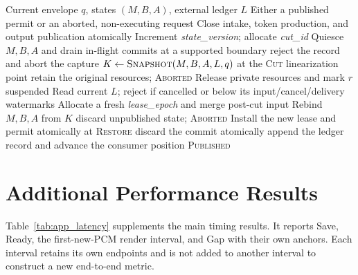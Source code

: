 \begin{algorithm}[tbp]
\caption{Save/resume protocol for logical request $r$.}
\label{alg:save_resume}
\begin{algorithmic}[1]
\Require Current envelope $q$, states $(M,B,A)$, external ledger $L$
\Ensure Either a published permit or an aborted, non-executing request
\State Close intake, token production, and output publication atomically
\State Increment \textit{state\_version}; allocate \textit{cut\_id}
\State Quiesce $M,B,A$ and drain in-flight commits at a supported boundary
    \State reject the record and abort the capture
\EndIf
\State $K \gets \Call{Snapshot}{M,B,A,L,q}$ at the \textsc{Cut} linearization point
    \State retain the original resources; \Return \textsc{Aborted}
\EndIf
\State Release private resources and mark $r$ suspended
\State Read current $L$; reject if cancelled or below its input/cancel/delivery watermarks
\State Allocate a fresh \textit{lease\_epoch} and merge post-cut input
\State Rebind $M,B,A$ from $K$
    \State discard unpublished state; \Return \textsc{Aborted}
\EndIf
\State Install the new lease and permit atomically at \textsc{Restore}
        \State discard the commit
    \Else
        \State atomically append the ledger record and advance the consumer position
    \EndIf
\EndWhile
\State \Return \textsc{Published}
\end{algorithmic}
\end{algorithm}


\section{Additional Performance Results}
\label{app:performance}

Table~\ref{tab:app_latency} supplements the main timing results.
It reports Save, Ready, the first-new-PCM render interval, and Gap with
their own anchors. Each interval retains its own endpoints and is not
added to another interval to construct a new end-to-end metric.


